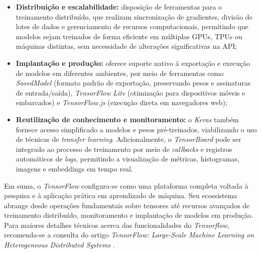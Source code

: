 \begin{itemize}
    \item \textbf{Distribuição e escalabilidade:} disposição de ferramentas para o treinamento distribuído, que realizam sincronização de gradientes, divisão de lotes de dados e gerenciamento de recursos computacionais, permitindo que modelos sejam treinados de forma eficiente em múltiplas \acsp{GPU}, \acsp{TPU} ou máquinas distintas, sem necessidade de alterações significativas na \acs{API};

    \item \textbf{Implantação e produção:} oferece suporte nativo à exportação e execução de modelos em diferentes ambientes, por meio de ferramentas como \textit{SavedModel} (formato padrão de exportação, preservando pesos e assinaturas de entrada/saída), \textit{TensorFlow Lite} (otimização para dispositivos móveis e embarcados) e \textit{TensorFlow.js} (execução direta em navegadores web);

    \item \textbf{Reutilização de conhecimento e monitoramento:} o \textit{Keras} também fornece acesso simplificado a modelos e pesos pré-treinados, viabilizando o uso de técnicas de \textit{transfer learning}. Adicionalmente, o \textit{TensorBoard} pode ser integrado ao processo de treinamento por meio de \textit{callbacks} e registros automáticos de \textit{logs}, permitindo a visualização de métricas, histogramas, imagens e embeddings em tempo real.

\end{itemize}

Em suma, o  \textit{TensorFlow} configura-se como uma plataforma completa voltada à pesquisa e à aplicação prática em aprendizado de máquina. Seu ecossistema abrange desde operações fundamentais sobre tensores até recursos avançados de treinamento distribuído, monitoramento e implantação de modelos em produção. Para maiores detalhes técnicos acerca das funcionalidades do \textit{Tensorflow}, recomenda-se a consulta do artigo \textit{TensorFlow: Large-Scale Machine Learning on Heterogeneous Distributed Systems} \cite{abadi2016tensorflow}.


